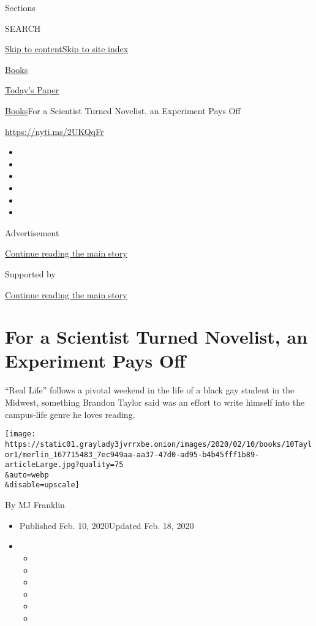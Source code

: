 Sections

SEARCH

\protect\hyperlink{site-content}{Skip to
content}\protect\hyperlink{site-index}{Skip to site index}

\href{https://www.nytimes3xbfgragh.onion/section/books}{Books}

\href{https://myaccount.nytimes3xbfgragh.onion/auth/login?response_type=cookie\&client_id=vi}{}

\href{https://www.nytimes3xbfgragh.onion/section/todayspaper}{Today's
Paper}

\href{/section/books}{Books}\textbar{}For a Scientist Turned Novelist,
an Experiment Pays Off

\url{https://nyti.ms/2UKQqFr}

\begin{itemize}
\item
\item
\item
\item
\item
\item
\end{itemize}

Advertisement

\protect\hyperlink{after-top}{Continue reading the main story}

Supported by

\protect\hyperlink{after-sponsor}{Continue reading the main story}

\hypertarget{for-a-scientist-turned-novelist-an-experiment-pays-off}{%
\section{For a Scientist Turned Novelist, an Experiment Pays
Off}\label{for-a-scientist-turned-novelist-an-experiment-pays-off}}

``Real Life'' follows a pivotal weekend in the life of a black gay
student in the Midwest, something Brandon Taylor said was an effort to
write himself into the campus-life genre he loves reading.

\texttt{[image: https://static01.graylady3jvrrxbe.onion/images/2020/02/10/books/10Taylor1/merlin\_167715483\_7ec949aa-aa37-47d0-ad95-b4b45fff1b89-articleLarge.jpg?quality=75\\\&auto=webp\\\&disable=upscale]}

By MJ Franklin

\begin{itemize}
\item
  Published Feb. 10, 2020Updated Feb. 18, 2020
\item
  \begin{itemize}
  \item
  \item
  \item
  \item
  \item
  \item
  \end{itemize}
\end{itemize}

